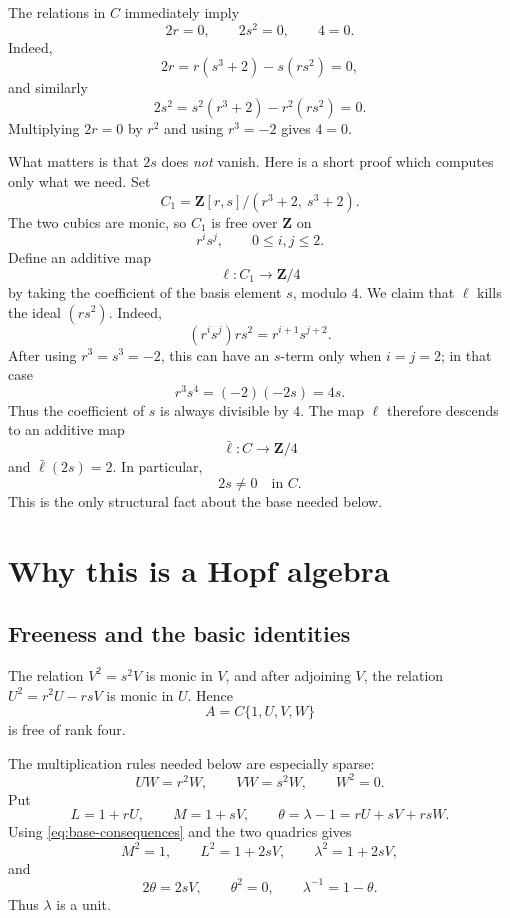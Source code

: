 \documentclass[11pt]{article}
\newcommand{\Z}{\mathbf Z}
\theoremstyle{remark}
\begin{document}
The relations in \(C\) immediately imply
\begin{equation}\label{eq:base-consequences}
 2r=0,\qquad 2s^2=0,\qquad 4=0.
\end{equation}
Indeed,
\[
 2r=r(s^3+2)-s(rs^2)=0,
\]
and similarly
\[
 2s^2=s^2(r^3+2)-r^2(rs^2)=0.
\]
Multiplying \(2r=0\) by \(r^2\) and using \(r^3=-2\) gives \(4=0\).

What matters is that \(2s\) does \emph{not} vanish.  Here is a short proof
which computes only what we need.  Set
\[
 C_1=\Z[r,s]/(r^3+2,\ s^3+2).
\]
The two cubics are monic, so \(C_1\) is free over \(\Z\) on
\[
 r^is^j,\qquad 0\le i,j\le2.
\]
Define an additive map
\[
 \ell:C_1\longrightarrow\Z/4
\]
by taking the coefficient of the basis element \(s\), modulo \(4\).
We claim that \(\ell\) kills the ideal \((rs^2)\).  Indeed,
\[
 (r^is^j)rs^2=r^{i+1}s^{j+2}.
\]
After using \(r^3=s^3=-2\), this can have an \(s\)-term only when
\(i=j=2\); in that case
\[
 r^3s^4=(-2)(-2s)=4s.
\]
Thus the coefficient of \(s\) is always divisible by \(4\).  The map
\(\ell\) therefore descends to an additive map
\[
 \bar\ell:C\longrightarrow\Z/4
\]
and \(\bar\ell(2s)=2\).  In particular,
\begin{equation}\label{eq:2s-nonzero}
 2s\ne0\quad\text{in }C.
\end{equation}
This is the only structural fact about the base needed below.

\section{Why this is a Hopf algebra}

\subsection*{Freeness and the basic identities}

The relation \(V^2=s^2V\) is monic in \(V\), and after adjoining \(V\), the
relation \(U^2=r^2U-rsV\) is monic in \(U\).  Hence
\[
 A=C\{1,U,V,W\}
\]
is free of rank four.

The multiplication rules needed below are especially sparse:
\begin{equation}\label{eq:W-rules}
 UW=r^2W,\qquad VW=s^2W,\qquad W^2=0.
\end{equation}
Put
\[
 L=1+rU,\qquad M=1+sV,\qquad
 \theta=\lambda-1=rU+sV+rsW.
\]
Using \eqref{eq:base-consequences} and the two quadrics gives
\begin{equation}\label{eq:lambda-identities}
 M^2=1,\qquad
 L^2=1+2sV,\qquad
 \lambda^2=1+2sV,
\end{equation}
and
\begin{equation}\label{eq:theta-identities}
 2\theta=2sV,\qquad
 \theta^2=0,\qquad
 \lambda^{-1}=1-\theta.
\end{equation}
Thus \(\lambda\) is a unit.
\end{document}
